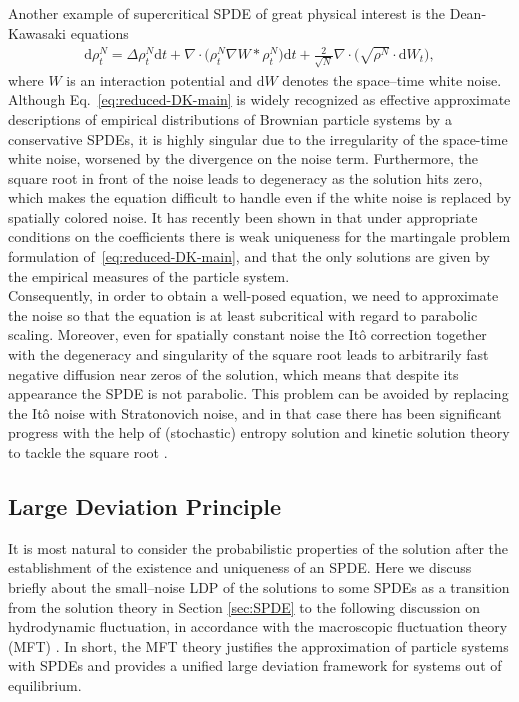 Another example of supercritical SPDE of great physical interest is the Dean-Kawasaki equations
\begin{align}\label{eq:reduced-DK-main}
    \mathrm{d}\rho^N_t = \Delta \rho^N_t \mathrm{d}t + \nabla \cdot \big(\rho^N_t  \nabla W \ast \rho^N_t \big)\mathrm{d}t + \frac{2}{\sqrt{N}}\nabla \cdot \big(\sqrt{\rho^N} \cdot \mathrm{d}W_t\big),
\end{align}
where $W$ is an interaction potential and $\mathrm{d}W$ denotes the space--time white noise. Although Eq.~\eqref{eq:reduced-DK-main} is widely recognized as effective approximate descriptions of empirical distributions of Brownian particle systems by a conservative SPDEs, it is highly singular due to the irregularity of the space-time white noise, worsened by the divergence on the noise term. Furthermore, the square root in front of the noise leads to degeneracy as the solution hits zero, which makes the equation difficult to handle even if the white noise is replaced by spatially colored noise. It has recently been shown in \cite{KLvR19,KLvR20} that under appropriate conditions on the coefficients there is weak uniqueness for the martingale problem formulation of~\eqref{eq:reduced-DK-main}, and that the only solutions are given by the empirical measures of the particle system.\\


Consequently, in order to obtain a well-posed equation, we need to approximate the noise so that the equation is at least subcritical with regard to parabolic scaling. Moreover, even for spatially constant noise the It\^o correction together with the degeneracy and singularity of the square root leads to arbitrarily fast negative diffusion near zeros of the solution, which means that despite its appearance the SPDE is not parabolic. This problem can be avoided by replacing the It\^o noise with Stratonovich noise, and in that case there has been significant progress with the help of (stochastic) entropy solution and kinetic solution theory to tackle the square root \cite{FG21,DG20,GGK22}.

\subsection{Large Deviation Principle}

It is most natural to consider the probabilistic properties of the solution after the establishment of the existence and uniqueness of an SPDE. Here we discuss briefly about the small--noise LDP of the solutions to some SPDEs as a transition from the solution theory in Section \ref{sec:SPDE} to the following discussion on hydrodynamic fluctuation, in accordance with the macroscopic fluctuation theory (MFT) \cite{Bertini2015}. In short, the MFT theory justifies the approximation of particle systems with SPDEs and provides a unified large deviation framework for systems out of equilibrium.\\

